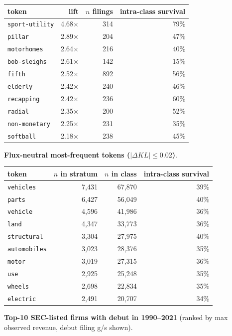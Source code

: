 \begin{tabular}{lrrr}
\toprule
token & lift & $n$ filings & intra-class survival \\
\midrule
\texttt{sport-utility} & 4.68$\times$ & 314 & 79\% \\
\texttt{pillar} & 2.89$\times$ & 204 & 47\% \\
\texttt{motorhomes} & 2.64$\times$ & 216 & 40\% \\
\texttt{bob-sleighs} & 2.61$\times$ & 142 & 15\% \\
\texttt{fifth} & 2.52$\times$ & 892 & 56\% \\
\texttt{elderly} & 2.42$\times$ & 240 & 46\% \\
\texttt{recapping} & 2.42$\times$ & 236 & 60\% \\
\texttt{radial} & 2.35$\times$ & 200 & 52\% \\
\texttt{non-monetary} & 2.25$\times$ & 231 & 35\% \\
\texttt{softball} & 2.18$\times$ & 238 & 45\% \\
\bottomrule
\end{tabular}

\textbf{Flux-neutral most-frequent tokens ($|\Delta KL|\leq 0.02$)}.

\begin{tabular}{lrrr}
\toprule
token & $n$ in stratum & $n$ in class & intra-class survival \\
\midrule
\texttt{vehicles} & 7,431 & 67,870 & 39\% \\
\texttt{parts} & 6,427 & 56,049 & 40\% \\
\texttt{vehicle} & 4,596 & 41,986 & 36\% \\
\texttt{land} & 4,347 & 33,773 & 36\% \\
\texttt{structural} & 3,304 & 27,975 & 40\% \\
\texttt{automobiles} & 3,023 & 28,376 & 35\% \\
\texttt{motor} & 3,019 & 27,315 & 36\% \\
\texttt{use} & 2,925 & 25,248 & 35\% \\
\texttt{wheels} & 2,698 & 22,834 & 35\% \\
\texttt{electric} & 2,491 & 20,707 & 34\% \\
\bottomrule
\end{tabular}

\textbf{Top-10 SEC-listed firms with debut in 1990--2021} (ranked by max observed revenue, debut filing g/s shown).

